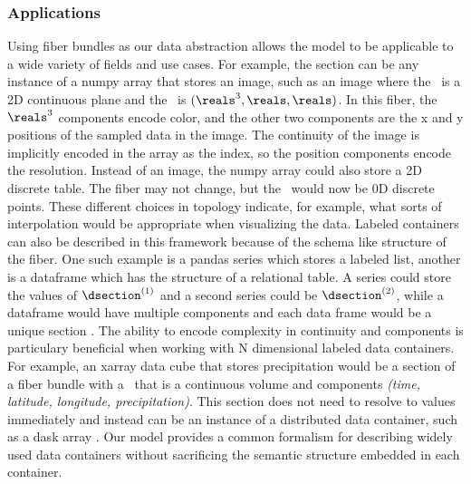 \documentclass[../main.tex]{subfiles}
\begin{document}
\subsubsection{Applications}
Using fiber bundles as our data abstraction allows the model to be applicable to a wide variety of fields and use cases. For example, the section can be any instance of a numpy array\cite{harris2020array} that stores an image, such as an image where the \dbase\ is a 2D continuous plane and the \dfiber\ is $(\reals^{3}, \reals, \reals)$. In this fiber, the $\reals^3$ components encode color, and the other two components are the x and y positions of the sampled data in the image. The continuity of the image is implicitly encoded in the array as the index, so the position components encode the resolution. Instead of an image, the numpy array could also store a 2D discrete table. The fiber may not change, but the \dbase\ would now be 0D discrete points. These different choices in topology indicate, for example, what sorts of interpolation would be appropriate when visualizing the data. Labeled containers can also be described in this framework because of the schema like structure of the fiber. One such example is a pandas series which stores a labeled list, another is a  dataframe\cite{jeff_reback_2020_3715232} which has the structure of a relational table. A series could store the values of $\dsection^{(1)}$ and a second series could be  $\dsection^{(2)}$, while a dataframe would have multiple components and each data frame would be a unique section \dsection. The ability to encode complexity in continuity and components is particulary beneficial when working with  N dimensional labeled data containers. For example, an xarray\cite{hoyer2017xarray} data cube that stores precipitation would be a section of a fiber bundle with a \dbase\ that is a continuous volume and components \textit{(time, latitude, longitude, precipitation)}. This section does not need to resolve to values immediately and instead can be an instance of a distributed data container, such as a dask array \cite{rocklinDaskParallelComputation2015}. Our model provides a common formalism for describing widely used data containers without sacrificing the semantic structure embedded in each container. 
\end{document}

